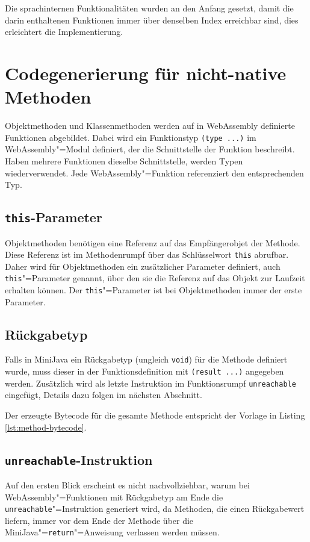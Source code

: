 Die sprachinternen Funktionalitäten wurden an den Anfang gesetzt, damit die darin enthaltenen Funktionen immer über denselben Index erreichbar sind, dies erleichtert die Implementierung.

\section{Codegenerierung für nicht-native Methoden}

Objektmethoden und Klassenmethoden werden auf in WebAssembly definierte Funktionen abgebildet. Dabei wird ein Funktionstyp \lstinline{(type ...)} im WebAssembly"=Modul definiert, der die Schnittstelle der Funktion beschreibt. Haben mehrere Funktionen dieselbe Schnittstelle, werden Typen wiederverwendet. Jede WebAssembly"=Funktion referenziert den entsprechenden Typ.

\subsection{\lstinline{this}-Parameter}
\label{subsec:this-Parameter}
Objektmethoden benötigen eine Referenz auf das Empfängerobjet der Methode. Diese Referenz ist im Methodenrumpf über das Schlüsselwort \lstinline{this} abrufbar. Daher wird für Objektmethoden ein zusätzlicher Parameter definiert, auch \lstinline{this}"=Parameter genannt, über den sie die Referenz auf das Objekt zur Laufzeit erhalten können. Der \lstinline{this}"=Parameter ist bei Objektmethoden immer der erste Parameter.

\subsection{Rückgabetyp}
Falls in MiniJava ein Rückgabetyp (ungleich \lstinline{void}) für die Methode definiert wurde, muss dieser in der Funktionsdefinition mit \lstinline{(result ...)} angegeben werden. Zusätzlich wird als letzte Instruktion im Funktionsrumpf \lstinline{unreachable} eingefügt, Details dazu folgen im nächsten Abschnitt.

Der erzeugte Bytecode für die gesamte Methode entspricht der Vorlage in Listing \ref{lst:method-bytecode}.



\subsection{\lstinline{unreachable}-Instruktion}
Auf den ersten Blick erscheint es nicht nachvollziehbar, warum bei WebAssembly"=Funktionen mit Rückgabetyp am Ende die \lstinline{unreachable}"=Instruktion generiert wird, da Methoden, die einen Rückgabewert liefern, immer vor dem Ende der Methode über die MiniJava"=\lstinline{return}"=Anweisung verlassen werden müssen.

